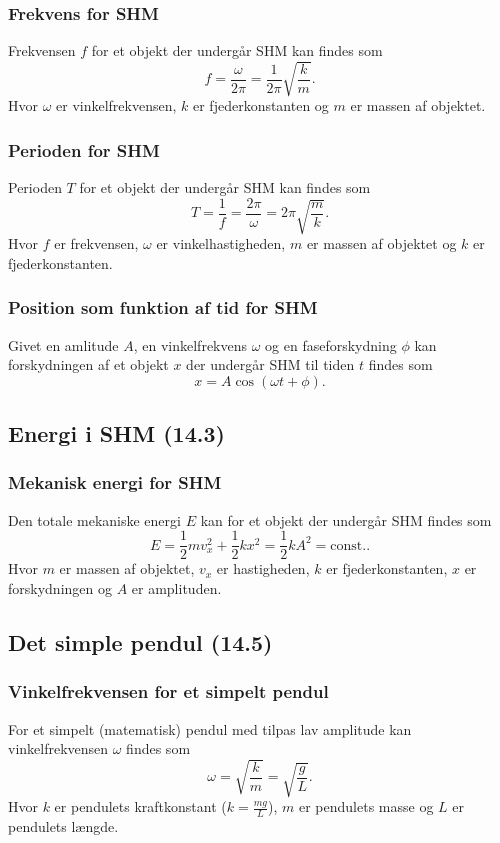 \subsubsection{Frekvens for SHM} \label{afs:SHMfrek}
Frekvensen $f$ for et objekt der undergår SHM kan findes som
\[ 
f = \frac{\omega}{2\pi} = \frac{1}{2\pi}\sqrt{\frac{k}{m}}
.\]
Hvor $\omega$ er vinkelfrekvensen, $k$ er fjederkonstanten og $m$ er massen af objektet.


\subsubsection{Perioden for SHM} \label{afs:SHMper}
Perioden $T$ for et objekt der undergår SHM kan findes som
\[ 
T = \frac{1}{f} = \frac{2\pi}{\omega} = 2\pi \sqrt{\frac{m}{k}}
.\]
Hvor $f$ er frekvensen, $\omega$ er vinkelhastigheden, $m$ er massen af objektet og $k$ er fjederkonstanten.


\subsubsection{Position som funktion af tid for SHM} \label{afs:SHMpos}
Givet en amlitude $A$, en vinkelfrekvens $\omega$ og en faseforskydning $\phi$ kan forskydningen af et objekt $x$ der undergår SHM til tiden $t$ findes som
\[ 
x = A \cos (\omega t + \phi)
.\]

\subsection{Energi i SHM (14.3)}

\subsubsection{Mekanisk energi for SHM} \label{afs:emekSHM}
Den totale mekaniske energi $E$ kan for et objekt der undergår SHM findes som
\[ 
E = \frac{1}{2}mv_x^2 + \frac{1}{2}kx^2 = \frac{1}{2}kA^2 = \text{const.}
.\]
Hvor $m$ er massen af objektet, $v_x$ er hastigheden, $k$ er fjederkonstanten, $x$ er forskydningen og $A$ er amplituden. 


\subsection{Det simple pendul (14.5)}

\subsubsection{Vinkelfrekvensen for et simpelt pendul} \label{afs:vinfrekspen}
For et simpelt (matematisk) pendul med tilpas lav amplitude kan vinkelfrekvensen $\omega$ findes som
\[ 
\omega = \sqrt{\frac{k}{m}} = \sqrt{\frac{g}{L}}
.\]
Hvor $k$ er pendulets kraftkonstant ($k = \frac{mg}{L}$), $m$ er pendulets masse og $L$ er pendulets længde.


